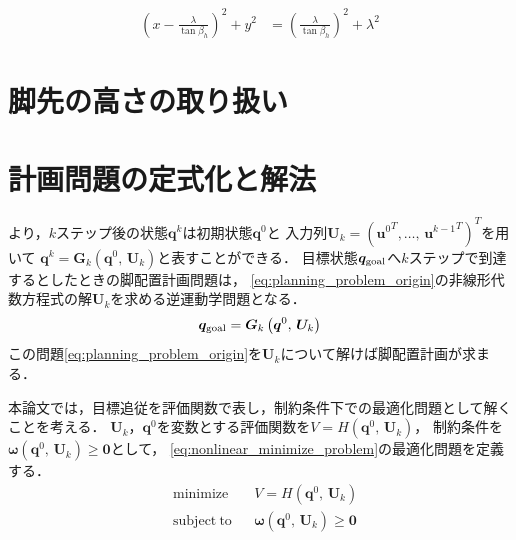 \documentclass[autodetect-engine,dvipdfmx-if-dvi,ja=standard,a4j,jbase=11pt,magstyle=nomag*]{bxjsreport}
\begin{document}
\begin{equation}
    \begin{aligned}
    \left(  x - \frac{\lambda}{\tan \beta_{h}}  \right) ^2 + y^2 & = \left( \frac{\lambda}{\tan \beta_{h}} \right) ^2 + \lambda^2
    \end{aligned}
\label{eq:beta_h_2}
\end{equation}

\section{脚先の高さの取り扱い}





\section{計画問題の定式化と解法}
より，$k$ステップ後の状態$\bm{q}^k$は初期状態$\bm{q}^0$と
入力列$\bm{U}_k = ( {\bm{u}^0}^T , \dots ,\, {\bm{u}^{k - 1}}^T )^T$を用いて
$\bm{q}^k = \bm{G}_k ( \bm{q}^0 ,\, \bm{U}_k )$と表すことができる．
目標状態$\bm{q}_{\mathrm{goal}}$へ$k$ステップで到達するとしたときの脚配置計画問題は，
\cref{eq:planning_problem_origin}の非線形代数方程式の解$\bm{U}_k$を求める逆運動学問題となる．
\begin{equation} \label{eq:planning_problem_origin}
    \bm{q}_{\mathrm{goal}} = \bm{G}_k \left( \bm{q}^0 ,\, \bm{U}_k \right)
\end{equation}
この問題\cref{eq:planning_problem_origin}を$\bm{U}_k$について解けば脚配置計画が求まる．

本論文では，目標追従を評価関数で表し，制約条件下での最適化問題として解くことを考える．
$\bm{U}_k$，$\bm{q}^0$を変数とする評価関数を$V = H ( \bm{q}^0 ,\, \bm{U}_k )$，
制約条件を$\bm{\omega} ( \bm{q}^0 ,\, \bm{U}_k ) \geq \bm{0}$として，
\cref{eq:nonlinear_minimize_problem}の最適化問題を定義する．
\begin{equation} \label{eq:nonlinear_minimize_problem}
    \begin{aligned}
        & \mathrm{minimize} && V = H \left( \bm{q}^0 ,\, \bm{U}_k \right) \\
        & \mathrm{subject~to} && \bm{\omega} \left( \bm{q}^0 ,\, \bm{U}_k \right) \geq \bm{0}
    \end{aligned}
\end{equation}
\end{document}
